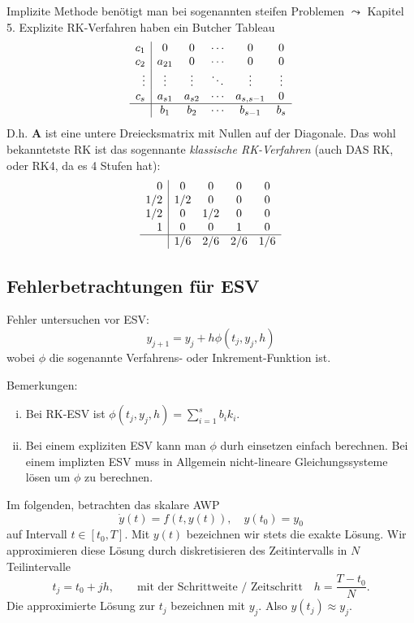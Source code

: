 \documentclass[a4paper]{article}
\newcommand{\mx}[1]{\mathbf{\bm{#1}}}
\begin{document}
Implizite Methode benötigt man bei sogenannten steifen Problemen $\leadsto$
Kapitel 5. Explizite RK-Verfahren haben ein Butcher Tableau
\[
  \begin{array}{r|ccccc}
    c_1    & 0      & 0      & \cdots & 0       & 0  \\
    c_2    & a_{21} & 0      & \cdots & 0       & 0  \\
    \vdots & \vdots & \vdots & \ddots & \vdots  & \vdots \\
    c_s    & a_{s1} & a_{s2} & \cdots & a_{s,s-1} & 0 \\
    \hline
           & b_1    & b_2    & \cdots & b_{s-1} & b_s
  \end{array}
\]
D.h. $\mx{A}$ ist eine untere Dreiecksmatrix mit Nullen auf der Diagonale. Das
wohl bekanntetste RK ist das sogennante \emph{klassische RK-Verfahren} (auch
DAS RK, oder RK4, da es 4 Stufen hat):
\[
  \begin{array}{r|cccc}
    0   & 0   & 0   & 0   & 0 \\
    1/2 & 1/2 & 0   & 0   & 0 \\
    1/2 & 0   & 1/2 & 0   & 0 \\
    1   & 0   & 0   & 1   & 0 \\
    \hline
        & 1/6 & 2/6 & 2/6 & 1/6
  \end{array}
\]

\subsection{Fehlerbetrachtungen für ESV}

Fehler untersuchen vor ESV:
\[
  y_{j+1} = y_j + h \phi(t_j, y_j, h)
\]
wobei $\phi$ die sogenannte Verfahrens- oder Inkrement-Funktion ist.

Bemerkungen:
\begin{enumerate}[(i)]
  \item Bei RK-ESV ist $\phi(t_j,y_j,h) = \sum_{i=1}^s b_i k_i$.
  \item Bei einem expliziten ESV kann man $\phi$ durh einsetzen einfach
    berechnen. Bei einem implizten ESV muss in Allgemein nicht-lineare
    Gleichungssysteme lösen um $\phi$ zu berechnen.
\end{enumerate}

Im folgenden, betrachten das skalare AWP
\[
  \dot{y}(t) = f(t, y(t)), \quad
  y(t_0) = y_0
\]
auf Intervall $t \in [t_0, T]$. Mit $y(t)$ bezeichnen wir stets  die exakte
Lösung. Wir approximieren diese Lösung durch diskretisieren des Zeitintervalls
in $N$ Teilintervalle
\[
  t_j = t_0 + jh, 
  \qquad\text{mit der Schrittweite / Zeitschritt}\quad
  h = \frac{T-t_0}{N}.
\]
Die approximierte Lösung zur $t_j$ bezeichnen mit $y_j$. Also $y(t_j) \approx
y_j$.
\end{document}
